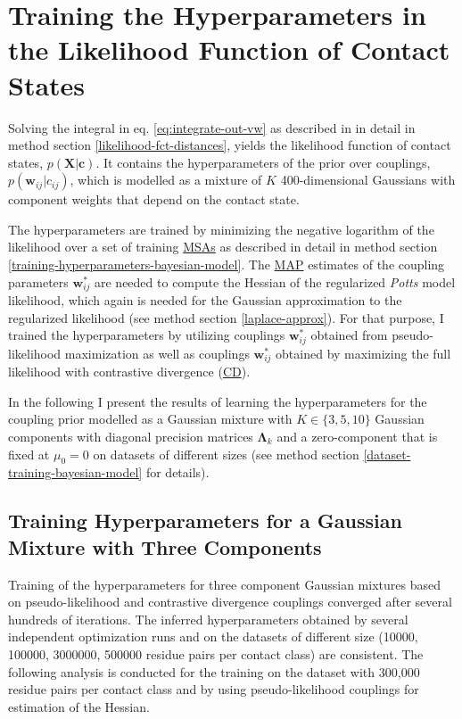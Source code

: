 \documentclass[11pt,a4paper,twoside]{book}
\newcommand{\Lk}{\mathbf{\Lambda}_k}
\renewcommand{\c}{\mathbf{c}}
\newcommand{\cij}{c_{ij}}
\newcommand{\wij}{\mathbf{w}_{ij}}
\newcommand{\X}{\mathbf{X}}
\theoremstyle{definition}
\theoremstyle{definition}
\theoremstyle{remark}
\begin{document}
\section{Training the Hyperparameters in the Likelihood Function of
Contact States}\label{bayesian-model-training-hyperparameters}

Solving the integral in eq. \eqref{eq:integrate-out-vw} as described in in
detail in method section \ref{likelihood-fct-distances}, yields the
likelihood function of contact states, \(p(\X | \c)\). It contains the
hyperparameters of the prior over couplings, \(p(\wij|\cij)\), which is
modelled as a mixture of \(K\) 400-dimensional Gaussians with component
weights that depend on the contact state.

The hyperparameters are trained by minimizing the negative logarithm of
the likelihood over a set of training \protect\hyperlink{abbrev}{MSAs}
as described in detail in method section
\ref{training-hyperparameters-bayesian-model}. The
\protect\hyperlink{abbrev}{MAP} estimates of the coupling parameters
\(\wij^*\) are needed to compute the Hessian of the regularized
\emph{Potts} model likelihood, which again is needed for the Gaussian
approximation to the regularized likelihood (see method section
\ref{laplace-approx}). For that purpose, I trained the hyperparameters
by utilizing couplings \(\wij^*\) obtained from pseudo-likelihood
maximization as well as couplings \(\wij^*\) obtained by maximizing the
full likelihood with contrastive divergence
(\protect\hyperlink{abbrev}{CD}).

In the following I present the results of learning the hyperparameters
for the coupling prior modelled as a Gaussian mixture with
\(K \in \{3,5,10\}\) Gaussian components with diagonal precision
matrices \(\Lk\) and a zero-component that is fixed at \(\mu_0=0\) on
datasets of different sizes (see method section
\ref{dataset-training-bayesian-model} for details).

\subsection{Training Hyperparameters for a Gaussian Mixture with Three
Components}\label{training-hyperparameters-for-a-gaussian-mixture-with-three-components}

Training of the hyperparameters for three component Gaussian mixtures
based on pseudo-likelihood and contrastive divergence couplings
converged after several hundreds of iterations. The inferred
hyperparameters obtained by several independent optimization runs and on
the datasets of different size (10000, 100000, 3000000, 500000 residue
pairs per contact class) are consistent. The following analysis is
conducted for the training on the dataset with 300,000 residue pairs per
contact class and by using pseudo-likelihood couplings for estimation of
the Hessian.
\end{document}
